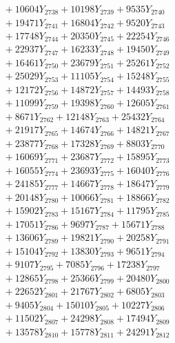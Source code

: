 \documentclass[a4paper,10pt]{article}
\begin{document}
{\begin{align}
&\;  + 10604 Y_{2738} + 10198 Y_{2739} + 9535 Y_{2740} \\[0.3ex]
&\;  + 19471 Y_{2741} + 16804 Y_{2742} + 9520 Y_{2743} \\[0.3ex]
&\;  + 17748 Y_{2744} + 20350 Y_{2745} + 22254 Y_{2746} \\[0.3ex]
&\;  + 22937 Y_{2747} + 16233 Y_{2748} + 19450 Y_{2749} \\[0.3ex]
&\;  + 16461 Y_{2750} + 23679 Y_{2751} + 25261 Y_{2752} \\[0.3ex]
&\;  + 25029 Y_{2753} + 11105 Y_{2754} + 15248 Y_{2755} \\[0.3ex]
&\;  + 12172 Y_{2756} + 14872 Y_{2757} + 14493 Y_{2758} \\[0.5ex]\allowbreak
&\;  + 11099 Y_{2759} + 19398 Y_{2760} + 12605 Y_{2761} \\[0.3ex]
&\;  + 8671 Y_{2762} + 12148 Y_{2763} + 25432 Y_{2764} \\[0.3ex]
&\;  + 21917 Y_{2765} + 14674 Y_{2766} + 14821 Y_{2767} \\[0.3ex]
&\;  + 23877 Y_{2768} + 17328 Y_{2769} + 8803 Y_{2770} \\[0.3ex]
&\;  + 16069 Y_{2771} + 23687 Y_{2772} + 15895 Y_{2773} \\[0.3ex]
&\;  + 16055 Y_{2774} + 23693 Y_{2775} + 16040 Y_{2776} \\[0.3ex]
&\;  + 24185 Y_{2777} + 14667 Y_{2778} + 18647 Y_{2779} \\[0.3ex]
&\;  + 20148 Y_{2780} + 10066 Y_{2781} + 18866 Y_{2782} \\[0.3ex]
&\;  + 15902 Y_{2783} + 15167 Y_{2784} + 11795 Y_{2785} \\[0.3ex]
&\;  + 17051 Y_{2786} + 9697 Y_{2787} + 15671 Y_{2788} \\[0.5ex]\allowbreak
&\;  + 13606 Y_{2789} + 19821 Y_{2790} + 20258 Y_{2791} \\[0.3ex]
&\;  + 15104 Y_{2792} + 13830 Y_{2793} + 9651 Y_{2794} \\[0.3ex]
&\;  + 9107 Y_{2795} + 7085 Y_{2796} + 17238 Y_{2797} \\[0.3ex]
&\;  + 12865 Y_{2798} + 25366 Y_{2799} + 20480 Y_{2800} \\[0.3ex]
&\;  + 22652 Y_{2801} + 21767 Y_{2802} + 6805 Y_{2803} \\[0.3ex]
&\;  + 9405 Y_{2804} + 15010 Y_{2805} + 10227 Y_{2806} \\[0.3ex]
&\;  + 11502 Y_{2807} + 24298 Y_{2808} + 17494 Y_{2809} \\[0.3ex]
&\;  + 13578 Y_{2810} + 15778 Y_{2811} + 24291 Y_{2812} \\[0.3ex]

\end{align}}
\end{document}
